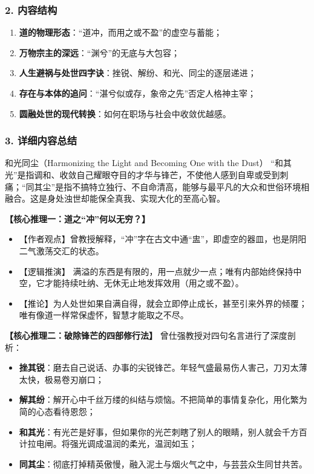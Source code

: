 \subsubsection{2. 内容结构}
\begin{enumerate}
    \item \textbf{道的物理形态}：“道冲，而用之或不盈”的虚空与蓄能；
    \item \textbf{万物宗主的深远}：“渊兮”的无底与大包容；
    \item \textbf{人生避祸与处世四字诀}：挫锐、解纷、和光、同尘的逐层递进；
    \item \textbf{存在与本体的追问}：“湛兮似或存，象帝之先”否定人格神主宰；
    \item \textbf{圆融处世的现代转换}：如何在职场与社会中收敛优越感。
\end{enumerate}

\subsubsection{3. 详细内容总结}

\begin{ConceptBox}{和光同尘（Harmonizing the Light and Becoming One with the Dust）}
“和其光”是指调和、收敛自己耀眼夺目的才华与锋芒，不使他人感到自卑或受到刺痛；“同其尘”是指不搞特立独行、不自命清高，能够与最平凡的大众和世俗环境相融合。这是身处浊世却能保全真我、实现大化的至高心智。
\end{ConceptBox}

\noindent\textbf{【核心推理一：道之“冲”何以无穷？】}
\begin{itemize}
    \item 【作者观点】曾教授解释，“冲”字在古文中通“盅”，即虚空的器皿，也是阴阳二气激荡交汇的状态。
    \item 【逻辑推演】
    满溢的东西是有限的，用一点就少一点；唯有内部始终保持中空，它才能持续吐纳、无休无止地发挥效用（用之或不盈）。
    \item 【推论】为人处世如果自满自得，就会立即停止成长，甚至引来外界的倾覆；唯有像道一样常保虚怀，智慧才能取之不尽。
\end{itemize}

\noindent\textbf{【核心推理二：破除锋芒的四部修行法】}
曾仕强教授对四句名言进行了深度剖析：
\begin{itemize}
    \item \textbf{挫其锐}：磨去自己说话、办事的尖锐锋芒。年轻气盛最易伤人害己，刀刃太薄太快，极易卷刃崩口；
    \item \textbf{解其纷}：解开心中千丝万缕的纠结与烦恼。不把简单的事情复杂化，用化繁为简的心态看待恩怨；
    \item \textbf{和其光}：有光芒是好事，但如果你的光芒刺瞎了别人的眼睛，别人就会千方百计拉电闸。将强光调成温润的柔光，温润如玉；
    \item \textbf{同其尘}：彻底打掉精英傲慢，融入泥土与烟火气之中，与芸芸众生同甘共苦。
\end{itemize}

